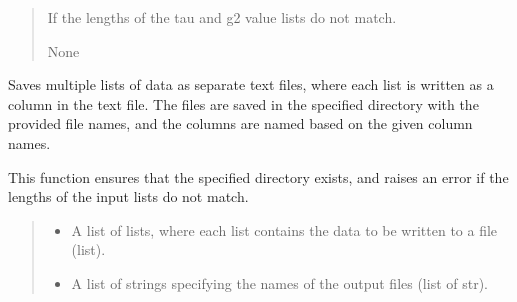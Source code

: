 \documentclass[letterpaper,10pt,english]{sphinxmanual}
\begin{document}
\begin{fulllineitems}
\begin{fulllineitems}
\begin{quote}
\begin{description}
\begin{itemize}
\end{itemize}

\sphinxAtStartPar
{} \textendash{} If the lengths of the tau and g2 value lists do not match.

\sphinxAtStartPar
None

\end{description}\end{quote}

\end{fulllineitems}


\begin{fulllineitems}
\label{\detokenize{createsavefile:createsavefile.createsavefile.save_lists_as_columns_txt}}
\pysigstartsignatures
{}
\pysigstopsignatures
\sphinxAtStartPar
Saves multiple lists of data as separate text files, where each list is written as a 
column in the text file. The files are saved in the specified directory with the 
provided file names, and the columns are named based on the given column names.

\sphinxAtStartPar
This function ensures that the specified directory exists, and raises an error if 
the lengths of the input lists do not match.
\begin{quote}\begin{description}
\begin{itemize}
\item {} 
\sphinxAtStartPar
{} \textendash{} A list of lists, where each list contains the data to be written to a file (list).

\item {} 
\sphinxAtStartPar
{} \textendash{} A list of strings specifying the names of the output files (list of str).


\end{itemize}
\end{description}
\end{quote}
\end{fulllineitems}
\end{fulllineitems}
\end{document}
